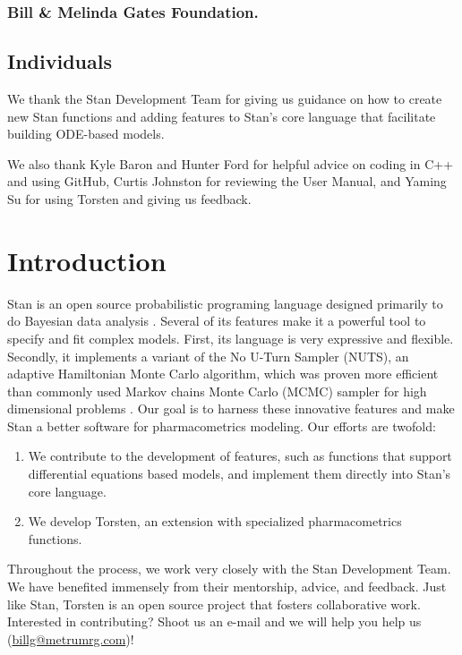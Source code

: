 \documentclass[11pt, reqno, oneside]{amsbook}
\numberwithin{equation}{chapter}
\numberwithin{figure}{chapter}
\numberwithin{table}{chapter}
\theoremstyle{remark}
\begin{document}
\subsection*{Bill \& Melinda Gates Foundation.}
\label{sec:org7d8f00e}
\section*{Individuals}
\label{sec:orgf2af76b}
We thank the Stan Development Team for giving us guidance on how to
create new Stan functions and adding features to Stan's core language
that facilitate building ODE-based models.

We also thank Kyle Baron and Hunter Ford for helpful advice on coding
in C++ and using GitHub, Curtis Johnston for reviewing the User
Manual, and Yaming Su for using Torsten and giving us feedback.

\chapter{Introduction}
\label{sec:org11bf365}
Stan is an open source probabilistic programing language designed
primarily to do Bayesian data analysis \cite{carpenter17_stan}. Several of its
features make it a powerful tool to specify and fit complex models. 
First, its language is very expressive and flexible.
Secondly, it implements a variant of the No U-Turn Sampler (NUTS),
an adaptive Hamiltonian Monte Carlo algorithm, which was proven
more efficient than commonly used Markov chains Monte Carlo (MCMC)
sampler for high dimensional problems 
\cite{hoffman_no-u-turn_2014, betancourt_hmc_2018}.
%
Our goal is to harness these innovative features and make Stan a better
software for pharmacometrics modeling. Our efforts are twofold:
\begin{enumerate}
\item We contribute to the development of features, such as functions that support differential equations based models, and implement them directly into Stan's core language.
\item We develop Torsten, an extension with specialized pharmacometrics functions.
\end{enumerate}

Throughout the process, we work very closely with the Stan Development
Team. 
We have benefited immensely from their mentorship, advice, and
feedback. Just like Stan, Torsten is an open source project that
fosters collaborative work. Interested in contributing? Shoot us an
e-mail and we will help you help us (\href{mailto:billg@metrumrg.com}{billg@metrumrg.com})!
\end{document}
